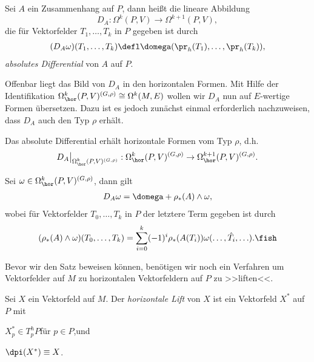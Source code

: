 \documentclass[%
	paper=a5,%
	fleqn,%
	DIV=18,%
	BCOR=0mm,
	fontsize=11pt,
	titlepage=false,%
	bibliography=totoc,
	DIV=18,%
	twoside=true,
	pdftitle=Riemannsche Geometrie,
	pdfauthor=Uwe Semmelmann,
	numbers=noendperiod]%
	{scrbook}
\begin{document}
\begin{defn}
Sei $A$ ein Zusammenhang auf $P$, dann heißt die lineare Abbildung 
\[D_A :
\Omega^k(P,V)\to \Omega^{k+1}(P,V),\]
die für Vektorfelder $T_1,\ldots,T_k$ in $P$ gegeben ist durch
\begin{align*}
(D_A\omega)(T_1,\ldots,T_k) \defl \domega(\pr_h(T_1),\ldots,\pr_h(T_k)),
\end{align*}
\emph{absolutes Differential} von $A$ auf $P$.\fish
\end{defn}

Offenbar liegt das Bild von $D_A$ in den horizontalen Formen. Mit Hilfe der
Identifikation $\Omega_\hor^k(P,V)^{(G,\rho)}\cong \Omega^k(M,E)$ wollen wir
$D_A$ nun auf $E$-wertige Formen übersetzen. Dazu ist es jedoch zunächst einmal erforderlich nachzuweisen, dass
$D_A$ auch den Typ $\rho$ erhält.

\begin{prop}
\label{prop:Absolutes-Differential}
\begin{propenum}
\item Das absolute Differential erhält horizontale Formen vom Typ $\rho$, d.h.
\begin{align*}
D_A\big|_{\Omega_\hor^k(P,V)^{(G,\rho)}} : \Omega_\hor^k(P,V)^{(G,\rho)} \to
\Omega_\hor^{k+1}(P,V)^{(G,\rho)}.
\end{align*}
\item Sei $\omega\in\Omega_\hor^k(P,V)^{(G,\rho)}$, dann gilt
\begin{align*}
D_A\omega = \domega + \rho_*(A)\wedge \omega,
\end{align*}
wobei für Vektorfelder $T_0,\ldots,T_k$ in $P$ der letztere Term gegeben ist
durch
\begin{align*}
(\rho_*(A)\wedge \omega)(T_0,\ldots,T_k) = 
\sum_{i=0}^k (-1)^i \rho_*(A(T_i))\omega(\ldots,\hat{T}_i,\ldots).\fish
\end{align*}
\end{propenum}
\end{prop}

Bevor wir den Satz beweisen können, benötigen wir noch ein Verfahren um
Vektorfelder auf $M$ zu horizontalen Vektorfeldern auf $P$ zu >>liften<<. 

\begin{defn}
Sei $X$ ein Vektorfeld auf $M$. Der \emph{horizontale Lift} von $X$ ist ein
Vektorfeld $X^*$ auf $P$ mit
\begin{defnenum}
\item $X^*_p\in T_p^hP$\quad für $p\in P$,\quad und
\item $\dpi(X^*) \equiv X$.\fish
\end{defnenum}
\end{defn}
\end{document}

